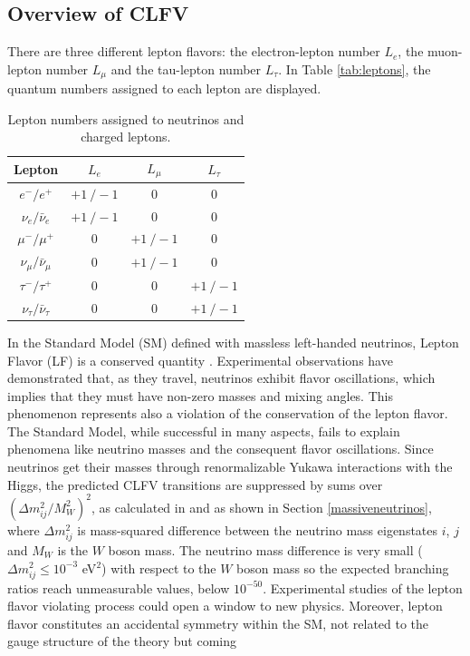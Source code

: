 \subsection{Overview of CLFV}
There are three different lepton flavors: the electron-lepton number $L_e$, the muon-lepton number $L_{\mu}$ and the tau-lepton number $L_{\tau}$. In Table \ref{tab:leptons}, the quantum numbers assigned to each lepton are displayed.
 \begin{center}  
\begin{table}[!h]
\centering
\renewcommand{\arraystretch}{1.5}
\begin{tabular}{c c c c}
\hline
Lepton & $L_e$ & $L_{\mu}$ & $L_{\tau}$\\
\hline
$e^-/e^+$ & $+1 \ /-1$ & 0 & 0 \\
$\nu_{e}/\bar{\nu}_{e}$ & $+1 \ /-1$ & 0 & 0 \\
$\mu^-/\mu^+$ & 0 & $+1 \ /-1$ & 0 \\
$\nu_{\mu}/\bar{\nu}_{\mu}$ & 0 & $+1 \ /-1$ & 0 \\
$\tau^-/\tau^+$ & 0 & 0 & $+1 \ /-1$\\
$\nu_{\tau}/\bar{\nu}_{\tau}$ & 0 & 0 & $+1 \ /-1$ \\
\hline
\end{tabular}
\caption{Lepton numbers assigned to neutrinos and charged leptons.}
\end{table}\label{tab:leptons}
\end{center}
In the Standard Model (SM) defined with massless left-handed neutrinos, Lepton Flavor (LF) is a conserved quantity \cite{universe8060299}. Experimental observations have demonstrated that, as they travel, neutrinos exhibit flavor oscillations, which implies that they must have non-zero masses and mixing angles. This phenomenon represents also a violation of the conservation of the lepton flavor. The Standard Model, while successful in many aspects, fails to explain phenomena like neutrino masses and the consequent flavor oscillations. Since neutrinos get their masses through renormalizable Yukawa interactions
with the Higgs, the predicted CLFV transitions are suppressed by sums over $(\Delta m^2_{i j}/M^2 _W)^2$, as calculated in \cite{MARCIANO1977303} and as shown in Section \ref{massiveneutrinos}, where $\Delta m^2_{ij}$ is mass-squared difference between the neutrino mass eigenstates $i$, $j$ and $M_W$ is the $W$ boson mass. The neutrino mass difference is very small ($\Delta m^2 _{i j} \leq 10^{-3}$ eV$^2$) with respect to the $W$ boson mass so the expected branching ratios reach unmeasurable values, below $10^{-50}$. Experimental studies of the lepton flavor violating process could open a window to new physics. Moreover, lepton flavor constitutes an accidental symmetry within the SM, not related to the gauge structure of the theory but coming
